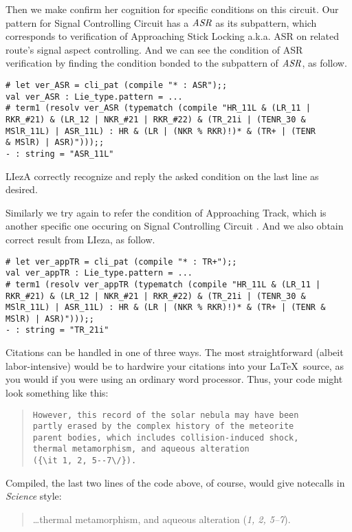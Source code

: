 \documentclass[12pt]{article}
\begin{document}
Then we make confirm her cognition for specific conditions on this circuit.
Our pattern for Signal Controlling Circuit has a $\text{\it ASR}$ as
its subpattern, which corresponds to verification of Approaching Stick
Locking a.k.a. ASR on related route's signal aspect controlling.
And we can see the condition of ASR verification by finding the condition
bonded to the subpattern of $\text{\it ASR}$, as follow.
\begin{verbatim}
# let ver_ASR = cli_pat (compile "* : ASR");; 
val ver_ASR : Lie_type.pattern = ...
# term1 (resolv ver_ASR (typematch (compile "HR_11L & (LR_11 |
RKR_#21) & (LR_12 | NKR_#21 | RKR_#22) & (TR_21i | (TENR_30 &
MSlR_11L) | ASR_11L) : HR & (LR | (NKR % RKR)!)* & (TR+ | (TENR
& MSlR) | ASR)")));;
- : string = "ASR_11L"
\end{verbatim}
LIezA correctly recognize and reply the asked condition on the last line
as desired.

Similarly we try again to refer the condition of Approaching Track, which is
another specific one occuring on Signal Controlling Circuit . And we also
obtain correct result from LIeza, as follow.
\begin{verbatim}
# let ver_appTR = cli_pat (compile "* : TR+");; 
val ver_appTR : Lie_type.pattern = ...
# term1 (resolv ver_appTR (typematch (compile "HR_11L & (LR_11 |
RKR_#21) & (LR_12 | NKR_#21 | RKR_#22) & (TR_21i | (TENR_30 &
MSlR_11L) | ASR_11L) : HR & (LR | (NKR % RKR)!)* & (TR+ | (TENR &
MSlR) | ASR)")));;
- : string = "TR_21i"
\end{verbatim}


Citations can be handled in one of three ways.  The most
straightforward (albeit labor-intensive) would be to hardwire your
citations into your \LaTeX\ source, as you would if you were using an
ordinary word processor.  Thus, your code might look something like
this:


\begin{quote}
\begin{verbatim}
However, this record of the solar nebula may have been
partly erased by the complex history of the meteorite
parent bodies, which includes collision-induced shock,
thermal metamorphism, and aqueous alteration
({\it 1, 2, 5--7\/}).
\end{verbatim}
\end{quote}


\noindent Compiled, the last two lines of the code above, of course, would give notecalls in {\it Science\/} style:

\begin{quote}
\ldots thermal metamorphism, and aqueous alteration ({\it 1, 2, 5--7\/}).
\end{quote}
\end{document}
